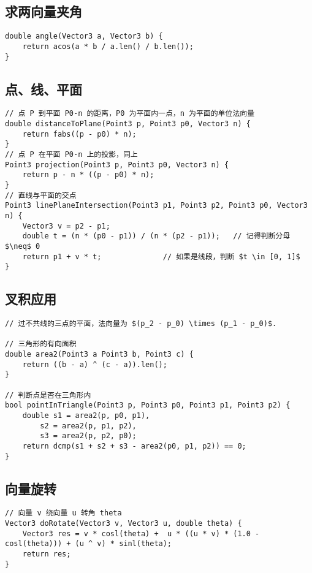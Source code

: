 \subsection{求两向量夹角}
\begin{verbatim}
double angle(Vector3 a, Vector3 b) {
    return acos(a * b / a.len() / b.len());
}
\end{verbatim}

\subsection{点、线、平面}
\begin{verbatim}
// 点 P 到平面 P0-n 的距离，P0 为平面内一点，n 为平面的单位法向量
double distanceToPlane(Point3 p, Point3 p0, Vector3 n) {
    return fabs((p - p0) * n);
}
// 点 P 在平面 P0-n 上的投影，同上
Point3 projection(Point3 p, Point3 p0, Vector3 n) {
    return p - n * ((p - p0) * n);
}
// 直线与平面的交点
Point3 linePlaneIntersection(Point3 p1, Point3 p2, Point3 p0, Vector3 n) {
    Vector3 v = p2 - p1;
    double t = (n * (p0 - p1)) / (n * (p2 - p1));   // 记得判断分母 $\neq$ 0
    return p1 + v * t;              // 如果是线段，判断 $t \in [0, 1]$
}
\end{verbatim}

\subsection{叉积应用}
\begin{verbatim}
// 过不共线的三点的平面，法向量为 $(p_2 - p_0) \times (p_1 - p_0)$.

// 三角形的有向面积
double area2(Point3 a Point3 b, Point3 c) {
    return ((b - a) ^ (c - a)).len();
}

// 判断点是否在三角形内
bool pointInTriangle(Point3 p, Point3 p0, Point3 p1, Point3 p2) {
    double s1 = area2(p, p0, p1),
        s2 = area2(p, p1, p2),
        s3 = area2(p, p2, p0);
    return dcmp(s1 + s2 + s3 - area2(p0, p1, p2)) == 0;
}
\end{verbatim}

\subsection{向量旋转}
\begin{verbatim}
// 向量 v 绕向量 u 转角 theta
Vector3 doRotate(Vector3 v, Vector3 u, double theta) {
    Vector3 res = v * cosl(theta) +  u * ((u * v) * (1.0 - cosl(theta))) + (u ^ v) * sinl(theta);
    return res;
}
\end{verbatim}

